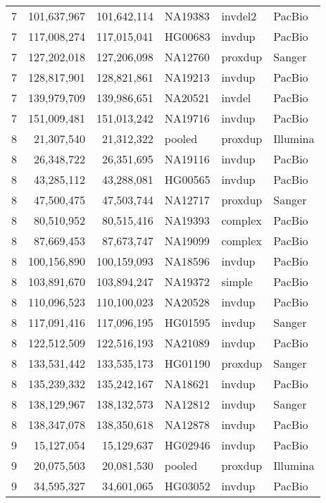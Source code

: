 {\begin{tiny}
\begin{longtable}{rrrlll}
    7   & 101,637,967 & 101,642,114 & NA19383 & invdel2 & PacBio  \\
    7   & 117,008,274 & 117,015,041 & HG00683 & invdup  & PacBio  \\
    7   & 127,202,018 & 127,206,098 & NA12760 & proxdup & Sanger  \\
    7   & 128,817,901 & 128,821,861 & NA19213 & invdup  & PacBio  \\
    7   & 139,979,709 & 139,986,651 & NA20521 & invdel  & PacBio  \\
    7   & 151,009,481 & 151,013,242 & NA19716 & invdup  & PacBio  \\
    8   & 21,307,540  & 21,312,322  & pooled  & proxdup & Illumina  \\
    8   & 26,348,722  & 26,351,695  & NA19116 & invdup  & PacBio  \\
    8   & 43,285,112  & 43,288,081  & HG00565 & invdup  & PacBio  \\
    8   & 47,500,475  & 47,503,744  & NA12717 & proxdup & Sanger  \\
    8   & 80,510,952  & 80,515,416  & NA19393 & complex & PacBio  \\
    8   & 87,669,453  & 87,673,747  & NA19099 & complex & PacBio  \\
    8   & 100,156,890 & 100,159,093 & NA18596 & invdup  & PacBio  \\
    8   & 103,891,670 & 103,894,247 & NA19372 & simple  & PacBio  \\
    8   & 110,096,523 & 110,100,023 & NA20528 & invdup  & PacBio  \\
    8   & 117,091,416 & 117,096,195 & HG01595 & invdup  & Sanger  \\
    8   & 122,512,509 & 122,516,193 & NA21089 & invdup  & PacBio  \\
    8   & 133,531,442 & 133,535,173 & HG01190 & proxdup & Sanger  \\
    8   & 135,239,332 & 135,242,167 & NA18621 & invdup  & PacBio  \\
    8   & 138,129,967 & 138,132,573 & NA12812 & invdup  & Sanger  \\
    8   & 138,347,078 & 138,350,618 & NA12878 & invdup  & PacBio  \\
    9   & 15,127,054  & 15,129,637  & HG02946 & invdup  & PacBio  \\
    9   & 20,075,503  & 20,081,530  & pooled  & proxdup & Illumina  \\
    9   & 34,595,327  & 34,601,065  & HG03052 & invdup  & PacBio  \\

\end{longtable}
\end{tiny}}
